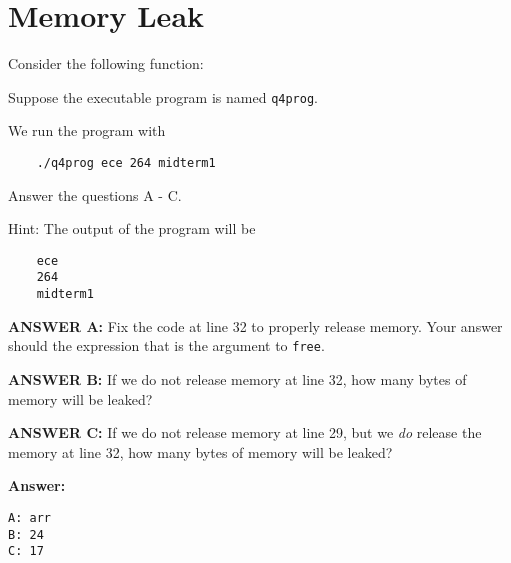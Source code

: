 \newpage
\section{Memory Leak}

Consider the following function:


\resetlinenumber[1]
\linenumbers
\begin{tt}
  
\end{tt}
\nolinenumbers


Suppose the executable program is named {\tt q4prog}.

We run the program with

\begin{verbatim}
	./q4prog ece 264 midterm1
\end{verbatim}

Answer the questions A - C.

\vspace{0.2in}

Hint: The output of the program will be

\begin{verbatim}
	ece
	264
	midterm1
\end{verbatim} 

\vspace{0.2in}

{\bf ANSWER A:} Fix the code at line 32 to properly release memory. Your answer should the expression that is the argument to {\tt free}.

\vspace{0.2in}

{\bf ANSWER B:} If we do not release memory at line 32, how
many bytes of memory will be leaked?

\vspace{0.2in}

{\bf ANSWER C:} If we do not release memory at line 29, but we
\emph{do} release the memory at line 32, how many bytes of memory will
be leaked?


\vspace{0.2in}

\ifexam


\else


{\bf Answer:}


\begin{verbatim}
A: arr
B: 24
C: 17
\end{verbatim}

\fi
